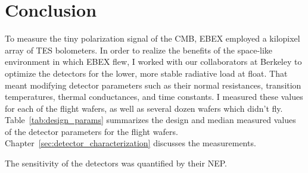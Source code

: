 \chapter{Conclusion}
\label{conclusion_chapter}

To measure the tiny polarization signal of the \ac{CMB}, \ac{EBEX} employed a kilopixel array of \ac{TES} bolometers. 
In order to realize the benefits of the space-like environment in which \ac{EBEX} flew, I worked with our collaborators at Berkeley to optimize the detectors for the lower, more stable radiative load at float.  
That meant modifying detector parameters such as their normal resistances, transition temperatures, thermal conductances, and time constants. 
I measured these values for each of the flight wafers, as well as several dozen wafers which didn't fly. 
Table~\ref{tab:design_params} summarizes the design and median measured values of the detector parameters for the flight wafers. 
Chapter~\ref{sec:detector_characterization} discusses the measurements. 

The sensitivity of the detectors was quantified by their \ac{NEP}. 



